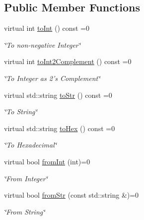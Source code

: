 \subsection*{Public Member Functions}
\begin{DoxyCompactItemize}
\item 
virtual int \hyperlink{classiWord_a3349d0a243d3432bb35b76af8420b1d9}{toInt} () const =0
\begin{DoxyCompactList}\small\item\em \char`\"{}To non-\/negative Integer\char`\"{} \item\end{DoxyCompactList}\item 
virtual int \hyperlink{classiWord_a1377d01257b792c748b013be60b089e6}{toInt2Complement} () const =0
\begin{DoxyCompactList}\small\item\em \char`\"{}To Integer as 2's Complement\char`\"{} \item\end{DoxyCompactList}\item 
virtual std::string \hyperlink{classiWord_a0114861c4b660286834ad637f11dc4f4}{toStr} () const =0
\begin{DoxyCompactList}\small\item\em \char`\"{}To String\char`\"{} \item\end{DoxyCompactList}\item 
virtual std::string \hyperlink{classiWord_a7fc28d0251f8acb4dc3f388fc25c57d1}{toHex} () const =0
\begin{DoxyCompactList}\small\item\em \char`\"{}To Hexadecimal\char`\"{} \item\end{DoxyCompactList}\item 
virtual bool \hyperlink{classiWord_a6421bf139c6eb4044446997606cb65e7}{fromInt} (int)=0
\begin{DoxyCompactList}\small\item\em \char`\"{}From Integer\char`\"{} \item\end{DoxyCompactList}\item 
virtual bool \hyperlink{classiWord_ad8df9e06ccb87d1e65766120713ef545}{fromStr} (const std::string \&)=0
\begin{DoxyCompactList}\small\item\em \char`\"{}From String\char`\"{} \item\end{DoxyCompactList}\item 

\end{DoxyCompactItemize}
